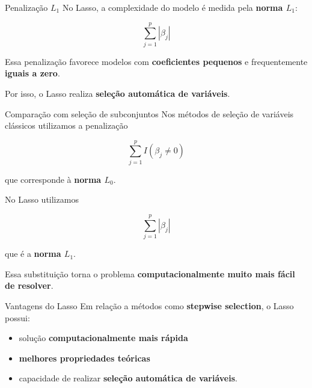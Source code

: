 \documentclass[
  ignorenonframetext,
  aspectratio=169,
]{beamer}
\providecommand{\tightlist}{%
  \setlength{\itemsep}{0pt}\setlength{\parskip}{0pt}}
\begin{document}
\begin{frame}
\begin{block}{Penalização \(L_1\)}
\label{penalizauxe7uxe3o-l_1}
No Lasso, a complexidade do modelo é medida pela \textbf{norma \(L_1\)}:

\[
\sum_{j=1}^{p} |\beta_j|
\]

Essa penalização favorece modelos com \textbf{coeficientes pequenos} e
frequentemente \textbf{iguais a zero}.

Por isso, o Lasso realiza \textbf{seleção automática de variáveis}.
\end{block}
\end{frame}

\begin{frame}
\begin{block}{Comparação com seleção de subconjuntos}
\label{comparauxe7uxe3o-com-seleuxe7uxe3o-de-subconjuntos}
Nos métodos de seleção de variáveis clássicos utilizamos a penalização

\[
\sum_{j=1}^{p} I(\beta_j \neq 0)
\]

que corresponde à \textbf{norma \(L_0\)}.
\end{block}
\end{frame}

\begin{frame}
No Lasso utilizamos

\[
\sum_{j=1}^{p} |\beta_j|
\]

que é a \textbf{norma \(L_1\)}.

Essa substituição torna o problema \textbf{computacionalmente muito mais
fácil de resolver}.
\end{frame}

\begin{frame}
\begin{block}{Vantagens do Lasso}
\label{vantagens-do-lasso}
Em relação a métodos como \textbf{stepwise selection}, o Lasso possui:

\begin{itemize}
\tightlist
\item
  solução \textbf{computacionalmente mais rápida}
\item
  \textbf{melhores propriedades teóricas}
\item
  capacidade de realizar \textbf{seleção automática de variáveis}.
\end{itemize}
\end{block}
\end{frame}
\end{document}
